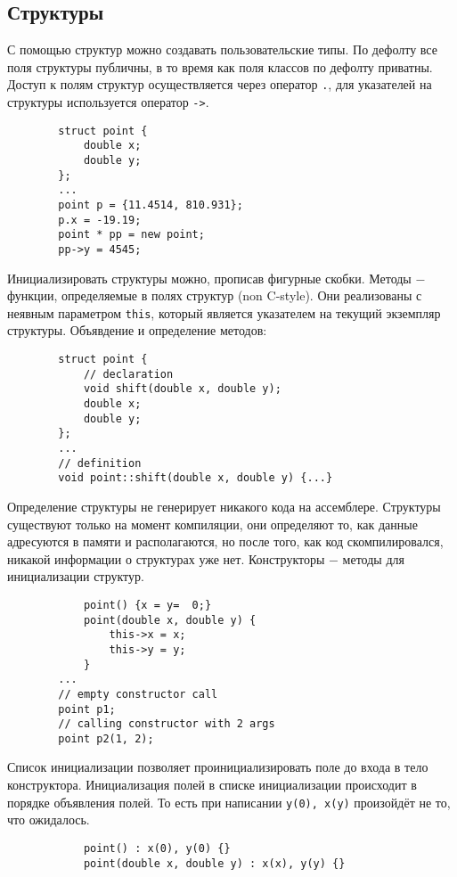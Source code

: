 \documentclass[15pt, a4paper]{article}
\newcommand{\nl}{\newline}
\begin{document}
    \subsection{Структуры}
    С помощью структур можно создавать пользовательские типы. По дефолту все поля структуры публичны,
    в то время как поля классов по дефолту приватны. \nl
    Доступ к полям структур осуществляется через оператор \texttt{.}, для указателей на структуры используется
    оператор \texttt{->}.
    \begin{verbatim}
        struct point {
        	double x;
            double y;
        };
        ...
        point p = {11.4514, 810.931};
        p.x = -19.19;
        point * pp = new point;
        pp->y = 4545;
    \end{verbatim}
    Инициализировать структуры можно, прописав фигурные скобки. \nl
    Методы $-$ функции, определяемые в полях структур (non C-style). Они  реализованы с неявным параметром
    \texttt{this}, который является указателем на текущий экземпляр структуры.
    Объявдение и определение методов:
    \begin{verbatim}
    	struct point {
        	// declaration
        	void shift(double x, double y);
        	double x;
            double y;
        };
        ...
        // definition
        void point::shift(double x, double y) {...}        
    \end{verbatim}
    Определение структуры не генерирует никакого кода на ассемблере. Структуры существуют только на
    момент компиляции, они определяют то, как данные адресуются в памяти и располагаются, но после того,
    как код скомпилировался, никакой информации о структурах уже нет. \nl
    Конструкторы $-$ методы для инициализации структур.
    \begin{verbatim}
        	point() {x = y=  0;}
            point(double x, double y) {
            	this->x = x;
                this->y = y;
            }
        ...
        // empty constructor call
        point p1;
        // calling constructor with 2 args
        point p2(1, 2);
    \end{verbatim}
    Список инициализации позволяет проинициализировать поле до входа в тело конструктора. Инициализация
    полей в списке инициализации происходит в порядке объявления полей. То есть при написании \texttt{y(0),
    x(y)} произойдёт не то, что ожидалось.
    \begin{verbatim}
        	point() : x(0), y(0) {}
            point(double x, double y) : x(x), y(y) {}
    \end{verbatim}
\end{document}
